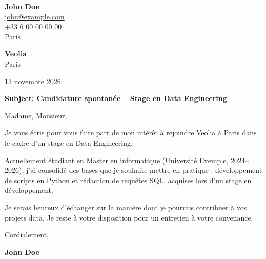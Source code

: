 \documentclass[11pt,a4paper]{article}
\begin{document}
{\Large\bfseries John Doe}\\[0.3cm]


\href{mailto:john@example.com}{john@example.com}\\



+33 6 00 00 00 00\\



Paris\\


\vspace{1cm}

\begin{flushright}

\textbf{Veolia}\\



Paris\\


\vspace{0.5cm}

13 novembre 2026

\end{flushright}

\vspace{0.8cm}

\textbf{Subject: Candidature spontanée – Stage en Data Engineering}

\vspace{0.6cm}


Madame, Monsieur,


\vspace{0.5cm}

\justifying


Je vous écris pour vous faire part de mon intérêt à rejoindre Veolia à Paris dans le cadre d’un stage en Data Engineering.

\par

Actuellement étudiant en Master en informatique (Université Exemple, 2024–2026), j’ai consolidé des bases que je souhaite mettre en pratique : développement de scripts en Python et rédaction de requêtes SQL, acquises lors d’un stage en développement.

\par

Je serais heureux d’échanger sur la manière dont je pourrais contribuer à vos projets data. Je reste à votre disposition pour un entretien à votre convenance.

\par


\vspace{0.7cm}


Cordialement,


\vspace{0.5cm}

\textbf{John Doe}
\end{document}

